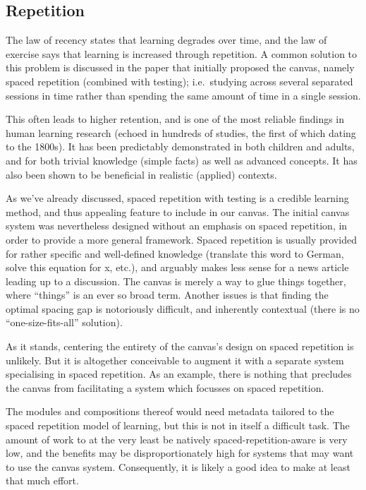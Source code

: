 \subsection{Repetition}
\label{repetition}
The law of recency states that learning degrades over time, and the law of 
exercise says that learning is increased through 
repetition\cite{murphy2011games}. A common solution to this problem is 
discussed in the paper that initially proposed the 
canvas\cite{berntsen2015enabling}, namely spaced repetition (combined with 
testing); i.e.\ studying across several separated sessions in time rather than 
spending the same amount of time in a single session.

This often leads to higher retention, and is one of the most reliable findings 
in human learning research (echoed in hundreds of studies, the first of which 
dating to the 1800s). It has been predictably demonstrated in both children 
and adults, and for both trivial knowledge (simple facts) as well as advanced 
concepts\cite{carpenter2012using}. It has also been shown to be beneficial in 
realistic (applied) contexts\cite{sobel2011spacing, carpenter2012using}.

As we've already discussed\cite{berntsen2015enabling}, spaced repetition with 
testing is a credible learning method, and thus appealing feature to include 
in our canvas. The initial canvas system was nevertheless designed without an 
emphasis on spaced repetition, in order to provide a more general framework. 
Spaced repetition is usually provided for rather specific and well-defined 
knowledge (translate this word to German, solve this equation for x, etc.), 
and arguably makes less sense for a news article leading up to a discussion. 
The canvas is merely a way to glue things together, where ``things'' is an 
ever so broad term. Another issues is that finding the optimal spacing gap is 
notoriously difficult, and inherently contextual (there is no 
``one-size-fits-all'' solution)\cite{carpenter2012using}.

As it stands, centering the entirety of the canvas's design on spaced 
repetition is unlikely. But it is altogether conceivable to augment it with a 
separate system specialising in spaced repetition. As an example, there is 
nothing that precludes the canvas from facilitating a system which focusses on 
spaced repetition.

The modules and compositions thereof would need metadata tailored to the 
spaced repetition model of learning, but this is not in itself a difficult 
task. The amount of work to at the very least be natively 
spaced-repetition-aware is very low, and the benefits may be 
disproportionately high for systems that may want to use the canvas system. 
Consequently, it is likely a good idea to make at least that much effort.

